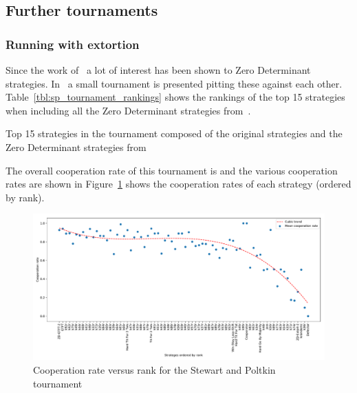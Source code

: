 \documentclass{article}
\begin{document}
\subsection{Further tournaments}


\subsubsection{Running with extortion}\label{sec:run_with_stewart_plotkin}

Since the work of~\cite{Press2012} a lot of interest has been shown to Zero
Determinant strategies. In~\cite{Stewart2012} a small tournament is presented
pitting these against each other. Table~\ref{tbl:sp_tournament_rankings}
shows the rankings of the top 15 strategies when including all the Zero
Determinant strategies from~\cite{Stewart2012}.

\begin{table}[!hbtp]
        \centering
        
        \caption{Top 15 strategies in the tournament composed of the original
                 strategies and the Zero Determinant strategies
                 from~\cite{Stewart2012}}
        \label{tbl:sp_tournament_rankings}
\end{table}

The overall cooperation rate of this tournament is
and the various
cooperation rates are shown in
Figure~\ref{fig:sp_tournament_cooperation_rate_versus_rank} shows the
cooperation rates of each strategy (ordered by rank).

\begin{figure}[!hbtp]
    \centering
    \includegraphics[width=.8\textwidth]{assets/sp_tournament_cooperation_rate_versus_rank.pdf}
    \caption{Cooperation rate versus rank for the Stewart and Poltkin tournament}
    \label{fig:sp_tournament_cooperation_rate_versus_rank}
\end{figure}
\end{document}
